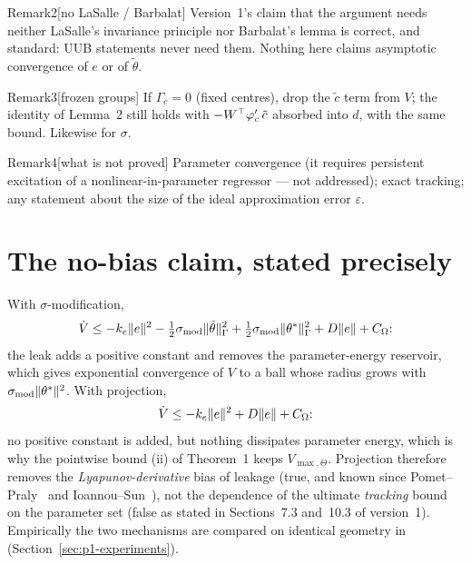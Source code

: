 \begin{rmk}{Remark}{2}[no LaSalle / Barbalat]
Version~1's claim that the argument needs neither LaSalle's invariance principle nor Barbalat's lemma is correct, and
standard: UUB statements never need them. Nothing here claims asymptotic convergence of $e$ or of $\tilde\theta$.
\end{rmk}

\begin{rmk}{Remark}{3}[frozen groups]
If $\Gamma_c=0$ (fixed centres), drop the $\tilde c$ term from $V$; the identity of Lemma~2 still holds with
$-W^\top\varphi'_c\,\tilde c$ absorbed into $d$, with the same bound. Likewise for $\sigma$.
\end{rmk}

\begin{rmk}{Remark}{4}[what is not proved]
Parameter convergence (it requires persistent excitation of a nonlinear-in-parameter regressor --- not addressed);
exact tracking; any statement about the size of the ideal approximation error $\varepsilon$.
\end{rmk}

\section{The no-bias claim, stated precisely}\label{sec:p1-nobias}

With $\sigma$-modification,
\[
\dot V\le-k_e\lVert e\rVert^2-\tfrac12\sigma_{\mathrm{mod}}\lVert \tilde\theta\rVert_\Gamma^2
+\tfrac12\sigma_{\mathrm{mod}}\lVert \theta^*\rVert_\Gamma^2+D\lVert e\rVert+C_\Omega\text{:}
\]
the leak adds a positive constant and removes the parameter-energy reservoir, which gives exponential convergence of $V$
to a ball whose radius grows with $\sigma_{\mathrm{mod}}\lVert \theta^*\rVert^2$. With projection,
\[
\dot V\le-k_e\lVert e\rVert^2+D\lVert e\rVert+C_\Omega\text{:}
\]
no positive constant is added, but nothing dissipates parameter energy, which is why the pointwise bound (ii) of
Theorem~1 keeps $V_{\max,\Theta}$. Projection therefore removes the \emph{Lyapunov-derivative} bias of leakage (true,
and known since Pomet--Praly~\cite{pp1992} and Ioannou--Sun~\cite{ioannou1996}), not the dependence of the ultimate
\emph{tracking} bound on the parameter set (false as stated in Sections~7.3 and~10.3 of version~1). Empirically the two
mechanisms are compared on identical geometry in 
(Section~\ref{sec:p1-experiments}).

